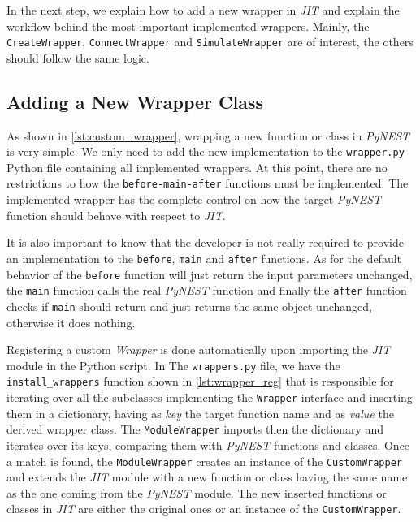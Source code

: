    In the next step, we explain how to add a new wrapper in \emph{JIT} and explain the workflow behind the most important implemented wrappers. Mainly, the \texttt{CreateWrapper}, \texttt{ConnectWrapper} and \texttt{SimulateWrapper} are of interest, the others should follow the same logic.
   
   
\subsection{Adding a New Wrapper Class}

As shown in \ref{lst:custom_wrapper}, wrapping a new function or class in \emph{PyNEST} is very simple. We only need to add the new implementation to the \texttt{wrapper.py} Python file containing all implemented wrappers. At this point, there are no restrictions to how the \texttt{before-main-after} functions must be implemented. The implemented wrapper has the complete  control on how the target \emph{PyNEST} function should behave with respect to \emph{JIT}.


It is also important to know that the developer is not really required to provide an  implementation to the \texttt{before}, \texttt{main} and \texttt{after} functions. As for the default behavior of the \texttt{before} function will just return the input parameters unchanged, the \texttt{main} function calls the real \emph{PyNEST} function and finally the \texttt{after} function checks if \texttt{main} should return and just returns the same object unchanged, otherwise it does nothing.

Registering a custom \emph{Wrapper} is done automatically upon importing the \emph{JIT} module in the Python script. In The \texttt{wrappers.py} file, we have the \texttt{install\_wrappers} function shown in \autoref{lst:wrapper_reg} that is responsible for iterating over all the subclasses implementing the \texttt{Wrapper} interface and inserting them in a dictionary, having as \emph{key} the target function name and as \emph{value} the derived wrapper class. The \texttt{ModuleWrapper} imports then the dictionary and iterates over its keys, comparing them with \emph{PyNEST} functions and classes. Once a match is found, the \texttt{ModuleWrapper} creates an instance of the \texttt{CustomWrapper} and extends the \emph{JIT} module with a new function or class having the same name as the one coming from the \emph{PyNEST} module. The new inserted functions or classes in \emph{JIT} are either the original ones or an instance of the \texttt{CustomWrapper}.

